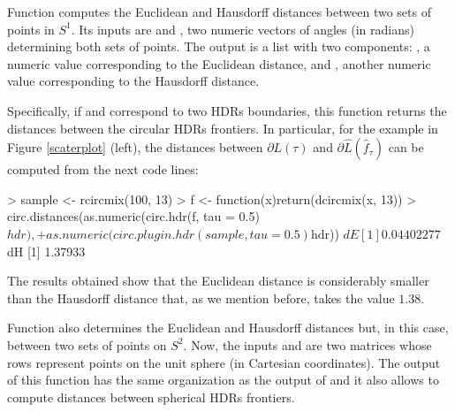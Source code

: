 %
%
%


Function  computes the Euclidean and Hausdorff distances between two sets of points in $S^1$. Its inputs are  and , two numeric vectors of angles (in radians) determining both sets of points. The output is a list with two components: , a numeric value corresponding to the Euclidean distance, and , another numeric value corresponding to the Hausdorff distance. 

Specifically, if  and  correspond to two HDRs boundaries, this function returns the distances between the circular HDRs frontiers. In particular, for the example in Figure \ref{scaterplot} (left), the distances between $\partial L(\tau)$ and $\partial \hat{L}(\hat{f}_{\tau})$ can be computed from the next code lines: 
\begin{example}
> sample <- rcircmix(100, 13)	
> f <- function(x){return(dcircmix(x, 13))}
> circ.distances(as.numeric(circ.hdr(f, tau = 0.5)$hdr),
    + as.numeric(circ.plugin.hdr(sample, tau = 0.5)$hdr))
$dE
[1] 0.04402277
$dH
[1] 1.37933
\end{example}
The results obtained show that the Euclidean distance is considerably smaller than the Hausdorff distance that, as we mention before, takes the value $1.38$.

Function  also determines the Euclidean and Hausdorff distances but, in this case, between two sets of points on $S^2$. Now, the inputs  and  are two matrices whose rows represent points on the unit sphere (in Cartesian coordinates). The output of this function has the same organization as the output of  and it also allows to compute distances between spherical HDRs frontiers.

